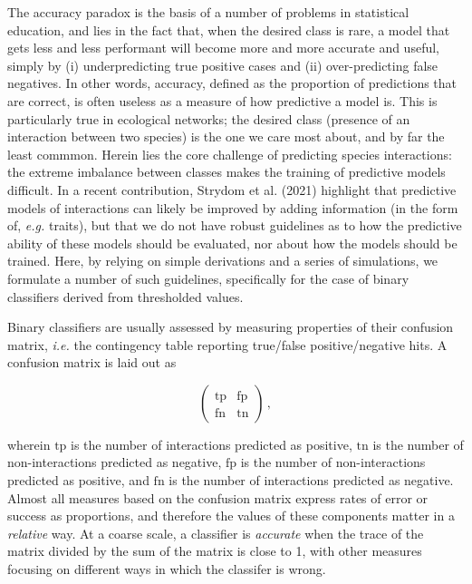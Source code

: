 \documentclass[11pt]{article}
\begin{document}
\vfill

\clearpage
\linenumbers
\pagestyle{normal}

The accuracy paradox is the basis of a number of problems in statistical
education, and lies in the fact that, when the desired class is rare, a
model that gets less and less performant will become more and more
accurate and useful, simply by (i) underpredicting true positive cases
and (ii) over-predicting false negatives. In other words, accuracy,
defined as the proportion of predictions that are correct, is often
useless as a measure of how predictive a model is. This is particularly
true in ecological networks; the desired class (presence of an
interaction between two species) is the one we care most about, and by
far the least commmon. Herein lies the core challenge of predicting
species interactions: the extreme imbalance between classes makes the
training of predictive models difficult. In a recent contribution,
Strydom et al. (2021) highlight that predictive models of interactions
can likely be improved by adding information (in the form of,
\emph{e.g.} traits), but that we do not have robust guidelines as to how
the predictive ability of these models should be evaluated, nor about
how the models should be trained. Here, by relying on simple derivations
and a series of simulations, we formulate a number of such guidelines,
specifically for the case of binary classifiers derived from thresholded
values.

Binary classifiers are usually assessed by measuring properties of their
confusion matrix, \emph{i.e.} the contingency table reporting true/false
positive/negative hits. A confusion matrix is laid out as

\[\begin{pmatrix}
    \text{tp} & \text{fp} \\
    \text{fn} & \text{tn}
\end{pmatrix} \,,\]

wherein \(\text{tp}\) is the number of interactions predicted as
positive, \(\text{tn}\) is the number of non-interactions predicted as
negative, \(\text{fp}\) is the number of non-interactions predicted as
positive, and \(\text{fn}\) is the number of interactions predicted as
negative. Almost all measures based on the confusion matrix express
rates of error or success as proportions, and therefore the values of
these components matter in a \emph{relative} way. At a coarse scale, a
classifier is \emph{accurate} when the trace of the matrix divided by
the sum of the matrix is close to 1, with other measures focusing on
different ways in which the classifer is wrong.
\end{document}
